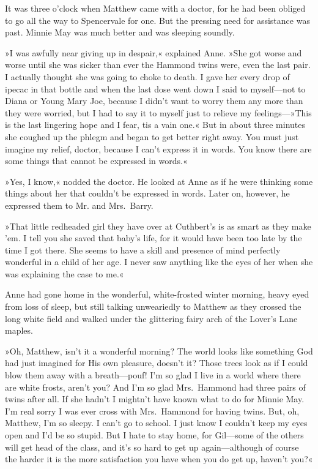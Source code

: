 It was three o'clock when Matthew came with a doctor, for he had been obliged to go all the way to Spencervale for one. But the pressing need for assistance was past. Minnie May was much better and was sleeping soundly.

»I was awfully near giving up in despair,« explained Anne. »She got worse and worse until she was sicker than ever the Hammond twins were, even the last pair. I actually thought she was going to choke to death. I gave her every drop of ipecac in that bottle and when the last dose went down I said to myself—not to Diana or Young Mary Joe, because I didn't want to worry them any more than they were worried, but I had to say it to myself just to relieve my feelings—»This is the last lingering hope and I fear, tis a vain one.« But in about three minutes she coughed up the phlegm and began to get better right away. You must just imagine my relief, doctor, because I can't express it in words. You know there are some things that cannot be expressed in words.«

»Yes, I know,« nodded the doctor. He looked at Anne as if he were thinking some things about her that couldn't be expressed in words. Later on, however, he expressed them to Mr. and Mrs.~Barry.

»That little redheaded girl they have over at Cuthbert's is as smart as they make 'em. I tell you she saved that baby's life, for it would have been too late by the time I got there. She seems to have a skill and presence of mind perfectly wonderful in a child of her age. I never saw anything like the eyes of her when she was explaining the case to me.«

Anne had gone home in the wonderful, white-frosted winter morning, heavy eyed from loss of sleep, but still talking unweariedly to Matthew as they crossed the long white field and walked under the glittering fairy arch of the Lover's Lane maples.

»Oh, Matthew, isn't it a wonderful morning? The world looks like something God had just imagined for His own pleasure, doesn't it? Those trees look as if I could blow them away with a breath—pouf! I'm so glad I live in a world where there are white frosts, aren't you? And I'm so glad Mrs.~Hammond had three pairs of twins after all. If she hadn't I mightn't have known what to do for Minnie May. I'm real sorry I was ever cross with Mrs.~Hammond for having twins. But, oh, Matthew, I'm so sleepy. I can't go to school. I just know I couldn't keep my eyes open and I'd be so stupid. But I hate to stay home, for Gil—some of the others will get head of the class, and it's so hard to get up again—although of course the harder it is the more satisfaction you have when you do get up, haven't you?«

